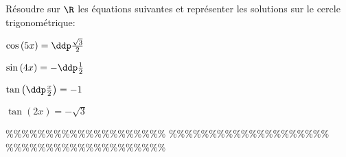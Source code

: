 



\begin{exercice}  \;
R\'esoudre sur $\R$ les \'equations suivantes et repr\'esenter les solutions sur le cercle trigonom\'etrique:\\
\begin{enumerate}
\begin{minipage}[t]{0.45\textwidth}
\item $\cos{(5x)}=\ddp\frac{\sqrt{3}}{2}$
\item $\sin{(4x)}=-\ddp\frac{1}{2}$
\end{minipage}
\begin{minipage}[t]{0.45\textwidth}
\item $\tan{\left(\ddp\frac{x}{2}\right)}=-1$
\item $\tan{(2x)}=-\sqrt{3}$
\end{minipage}
\end{enumerate}
\end{exercice}


\%\%\%\%\%\%\%\%\%\%\%\%\%\%\%\%\%\%\%\%
\%\%\%\%\%\%\%\%\%\%\%\%\%\%\%\%\%\%\%\%
\%\%\%\%\%\%\%\%\%\%\%\%\%\%\%\%\%\%\%\%




